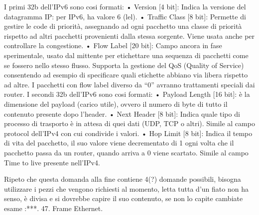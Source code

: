  

I primi 32b dell’IPv6 sono cosi formati:
•	Version [4 bit]: Indica la versione del datagramma IP: per IPv6, ha valore 6 (lel).
•	Traffic Class [8 bit]: Permette di gestire le code di priorità, assegnando ad ogni pacchetto una classe di priorità rispetto ad altri pacchetti provenienti dalla stessa sorgente. Viene usata anche per controllare la congestione.
•	Flow Label [20 bit]: Campo ancora in fase sperimentale, usato dal mittente per etichettare una sequenza di pacchetti come se fossero nello stesso flusso. Supporta la gestione del QoS (Quality of Service) consentendo ad esempio di specificare quali etichette abbiano via libera rispetto ad altre. I pacchetti con flow label diverso da “0” avranno trattamenti speciali dai router.
I secondi 32b dell’IPv6 sono cosi formati:
•	Payload Length [16 bit]: è la dimensione del payload (carico utile), ovvero il numero di byte di tutto il contenuto presente dopo l’header.
•	Next Header [8 bit]: Indica quale tipo di processo di trasporto è in attesa di quei dati (UDP, TCP o altri). Simile al campo protocol dell’IPv4 con cui condivide i valori.
•	Hop Limit [8 bit]: Indica il tempo di vita del pacchetto, il suo valore viene decrementato di 1 ogni volta che il pacchetto passa da un router, quando arriva a 0 viene scartato. Simile al campo Time to live presente nell’IPv4.

 
Ripeto che questa domanda alla fine contiene 4(?) domande possibili, bisogna utilizzare i pezzi che vengono richiesti al momento, letta tutta d’un fiato non ha senso, è divisa e si dovrebbe capire il suo contenuto, se non lo capite cambiate esame :***.
47.	Frame Ethernet.

